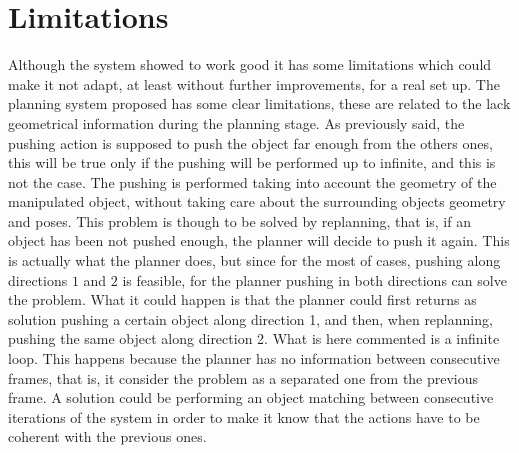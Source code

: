 \section*{Limitations}
Although the system showed to work good it has some limitations which could make it not adapt, at least without further improvements, for a real set up. 
The planning system proposed has some clear limitations, these are related to the lack geometrical information during the planning stage. 
As previously said, the pushing action is supposed to push the object far enough from the others ones, this will be true only if the pushing will be performed up to infinite, and this is not the case. The pushing is performed taking into account the geometry of the manipulated object, without taking care about the surrounding objects geometry and poses. This problem is though to be solved by replanning, that is, if an object has been not pushed enough, the planner will decide to push it again. This is actually what the planner does, but since for the most of cases, pushing along directions $1$ and $2$ is feasible, for the planner pushing in both directions can solve the problem. What it could happen is that the planner could first returns as solution pushing a certain object along direction 1, and then, when replanning, pushing the same object along direction 2. What is here commented is a infinite loop. This happens because the planner has no information between consecutive frames, that is, it consider the problem as a separated one from the previous frame. 
A solution could be performing an object matching between consecutive iterations of the system in order to make it know that the actions have to be coherent with the previous ones. 


